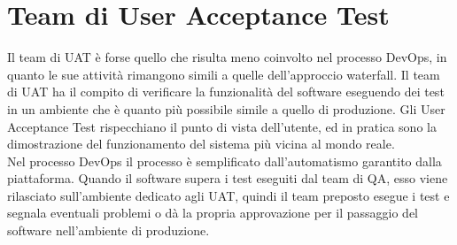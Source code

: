 \documentclass[a4paper, 12pt]{report}
\numberwithin{equation}{section}
\begin{document}
\section{Team di User Acceptance Test}
Il team di UAT è forse quello che risulta meno coinvolto nel processo DevOps, in quanto le sue attività rimangono simili a quelle dell’approccio waterfall.
Il team di UAT ha il compito di verificare la funzionalità del software eseguendo dei test in un ambiente che è quanto più possibile simile a quello di produzione. Gli User Acceptance Test rispecchiano il punto di vista dell’utente, ed in pratica sono la dimostrazione del funzionamento del sistema più vicina al mondo reale.\\
Nel processo DevOps il processo è semplificato dall’automatismo garantito dalla piattaforma. Quando il software supera i test eseguiti dal team di QA, esso viene rilasciato sull’ambiente dedicato agli UAT, quindi il team preposto esegue i test e segnala eventuali problemi o dà la propria approvazione per il passaggio del software nell’ambiente di produzione.
\end{document}
